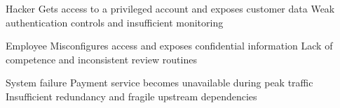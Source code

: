 \begin{corashighlevelrisktable}[
  caption={Documenting the high-level risks},
  label={tab:high-level-risks}
]
  \corashighlevelriskrow
    {Hacker}
    {Gets access to a privileged account and exposes customer data}
    {Weak authentication controls and insufficient monitoring}

  \corashighlevelriskrow
    {Employee}
    {Misconfigures access and exposes confidential information}
    {Lack of competence and inconsistent review routines}

  \corashighlevelriskrow
    {System failure}
    {Payment service becomes unavailable during peak traffic}
    {Insufficient redundancy and fragile upstream dependencies}
\end{corashighlevelrisktable}

